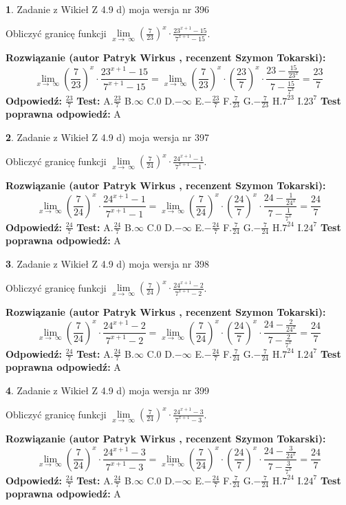 \documentclass[12pt, a4paper]{article}
\theoremstyle{definition} %
\newtheorem{zad}{}
\newcommand{\zadStart}[1]{\begin{zad}#1\newline}
\newcommand{\zadStop}{\end{zad}}
\newcommand{\rozwStart}[2]{\noindent \textbf{Rozwiązanie (autor #1 , recenzent #2): }\newline}
\newcommand{\rozwStop}{\newline}
\newcommand{\odpStart}{\noindent \textbf{Odpowiedź:}\newline}
\newcommand{\odpStop}{\newline}
\newcommand{\testStart}{\noindent \textbf{Test:}\newline}
\newcommand{\testStop}{\newline}
\newcommand{\kluczStart}{\noindent \textbf{Test poprawna odpowiedź:}\newline}
\newcommand{\kluczStop}{\newline}
\begin{document}
\zadStart{Zadanie z Wikieł Z 4.9 d) moja wersja nr 396}


Obliczyć granicę funkcji  $\lim\limits_{x\to\ \infty}(\frac{7}{23})^{x}\cdot\frac{23^{x+1}-15}{7^{x+1}-15}$.
\zadStop
\rozwStart{Patryk Wirkus}{Szymon Tokarski}
$$\lim\limits_{x\to\ \infty}(\frac{7}{23})^{x}\cdot\frac{23^{x+1}-15}{7^{x+1}-15}=\lim\limits_{x\to\ \infty}(\frac{7}{23})^{x}\cdot(\frac{23}{7})^{x} \cdot \frac{23-\frac{15}{23^{x}}}{7-\frac{15}{7^{x}}} = \frac{23}{7}$$
\rozwStop
\odpStart
$\frac{23}{7}$
\odpStop
\testStart
A.$\frac{23}{7}$ B.$\infty$ C.$0$ D.$-\infty$ E.$-\frac{23}{7}$
F.$\frac{7}{23}$ G.$-\frac{7}{23}$
H.$7^{23}$
I.$23^{7}$
\testStop
\kluczStart
A
\kluczStop



\zadStart{Zadanie z Wikieł Z 4.9 d) moja wersja nr 397}


Obliczyć granicę funkcji  $\lim\limits_{x\to\ \infty}(\frac{7}{24})^{x}\cdot\frac{24^{x+1}-1}{7^{x+1}-1}$.
\zadStop
\rozwStart{Patryk Wirkus}{Szymon Tokarski}
$$\lim\limits_{x\to\ \infty}(\frac{7}{24})^{x}\cdot\frac{24^{x+1}-1}{7^{x+1}-1}=\lim\limits_{x\to\ \infty}(\frac{7}{24})^{x}\cdot(\frac{24}{7})^{x} \cdot \frac{24-\frac{1}{24^{x}}}{7-\frac{1}{7^{x}}} = \frac{24}{7}$$
\rozwStop
\odpStart
$\frac{24}{7}$
\odpStop
\testStart
A.$\frac{24}{7}$ B.$\infty$ C.$0$ D.$-\infty$ E.$-\frac{24}{7}$
F.$\frac{7}{24}$ G.$-\frac{7}{24}$
H.$7^{24}$
I.$24^{7}$
\testStop
\kluczStart
A
\kluczStop



\zadStart{Zadanie z Wikieł Z 4.9 d) moja wersja nr 398}


Obliczyć granicę funkcji  $\lim\limits_{x\to\ \infty}(\frac{7}{24})^{x}\cdot\frac{24^{x+1}-2}{7^{x+1}-2}$.
\zadStop
\rozwStart{Patryk Wirkus}{Szymon Tokarski}
$$\lim\limits_{x\to\ \infty}(\frac{7}{24})^{x}\cdot\frac{24^{x+1}-2}{7^{x+1}-2}=\lim\limits_{x\to\ \infty}(\frac{7}{24})^{x}\cdot(\frac{24}{7})^{x} \cdot \frac{24-\frac{2}{24^{x}}}{7-\frac{2}{7^{x}}} = \frac{24}{7}$$
\rozwStop
\odpStart
$\frac{24}{7}$
\odpStop
\testStart
A.$\frac{24}{7}$ B.$\infty$ C.$0$ D.$-\infty$ E.$-\frac{24}{7}$
F.$\frac{7}{24}$ G.$-\frac{7}{24}$
H.$7^{24}$
I.$24^{7}$
\testStop
\kluczStart
A
\kluczStop



\zadStart{Zadanie z Wikieł Z 4.9 d) moja wersja nr 399}


Obliczyć granicę funkcji  $\lim\limits_{x\to\ \infty}(\frac{7}{24})^{x}\cdot\frac{24^{x+1}-3}{7^{x+1}-3}$.
\zadStop
\rozwStart{Patryk Wirkus}{Szymon Tokarski}
$$\lim\limits_{x\to\ \infty}(\frac{7}{24})^{x}\cdot\frac{24^{x+1}-3}{7^{x+1}-3}=\lim\limits_{x\to\ \infty}(\frac{7}{24})^{x}\cdot(\frac{24}{7})^{x} \cdot \frac{24-\frac{3}{24^{x}}}{7-\frac{3}{7^{x}}} = \frac{24}{7}$$
\rozwStop
\odpStart
$\frac{24}{7}$
\odpStop
\testStart
A.$\frac{24}{7}$ B.$\infty$ C.$0$ D.$-\infty$ E.$-\frac{24}{7}$
F.$\frac{7}{24}$ G.$-\frac{7}{24}$
H.$7^{24}$
I.$24^{7}$
\testStop
\kluczStart
A
\kluczStop
\end{document}

